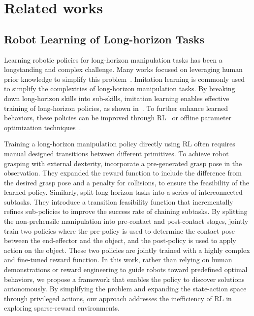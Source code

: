\section{Related works}
\subsection{Robot Learning of Long-horizon Tasks}
Learning robotic policies for long-horizon manipulation tasks has been a longstanding and complex challenge. Many works focused on leveraging human prior knowledge to simplify this problem~\cite{cheng2023league, zhou2024spire, von2024art, wang2023mimicplay}.
Imitation learning is commonly used to simplify the complexities of long-horizon manipulation tasks. By breaking down long-horizon skills into sub-skills, imitation learning enables effective training of long-horizon policies, as shown in~\cite{luo2024multi, 10802807}. To further enhance learned behaviors, these policies can be improved through RL~\cite{triantafyllidis2023hybrid} or offline parameter optimization techniques~\cite{kumar2024practice}.

Training a long-horizon manipulation policy directly using RL often requires manual designed transitions between different primitives. To achieve robot grasping with external dexterity, \cite{zhou2023learning} incorporate a pre-generated grasp pose in the observation. They expanded the reward function to include the difference from the desired grasp pose and a penalty for collisions, to ensure the feasibility of the learned policy. Similarly, \cite{pmlr-v229-chen23e} split long-horizon tasks into a series of interconnected subtasks. They introduce a transition feasibility function that incrementally refines sub-policies to improve the success rate of chaining subtasks.
By splitting the non-prehensile manipulation into pre-contact and post-contact stages, \cite{kim2023pre} jointly train two policies where the pre-policy is used to determine the contact pose between the end-effector and the object, and the post-policy is used to apply action on the object. These two policies are jointly trained with a highly complex and fine-tuned reward function. In this work, rather than relying on human demonstrations or reward engineering to guide robots toward predefined optimal behaviors, we propose a framework that enables the policy to discover solutions autonomously. By simplifying the problem and expanding the state-action space through privileged actions, our approach addresses the inefficiency of RL in exploring sparse-reward environments.


